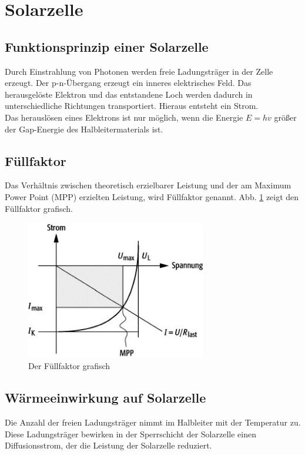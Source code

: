 \section{Solarzelle}

\subsection*{Funktionsprinzip einer Solarzelle}
Durch Einstrahlung von Photonen werden freie Ladungsträger in der Zelle erzeugt. Der p-n-Übergang erzeugt ein inneres elektrisches Feld. Das herausgelöste Elektron und das entstandene Loch werden dadurch in unterschiedliche Richtungen transportiert. Hieraus entsteht ein Strom.\\
Das herauslösen eines Elektrons ist nur möglich, wenn die Energie $E=hv$ größer der Gap-Energie des Halbleitermaterials ist.

\subsection*{Füllfaktor}
Das Verhältnis zwischen theoretisch erzielbarer Leistung und der am Maximum Power Point (MPP) erzielten Leistung, wird Füllfaktor genannt. 
Abb. \ref{fuell} zeigt den Füllfaktor grafisch.
\begin{figure}[htb]
	\centering
	\includegraphics[width=0.7\textwidth]{Abb/fuellfaktor.jpg}
	\caption{Der Füllfaktor grafisch}
	\label{fuell}
\end{figure}

\subsection*{Wärmeeinwirkung auf Solarzelle}
Die Anzahl der freien Ladungsträger nimmt im Halbleiter mit der Temperatur zu. Diese Ladungsträger bewirken in der Sperrschicht der Solarzelle einen Diffusionsstrom, der die Leistung der Solarzelle reduziert.

